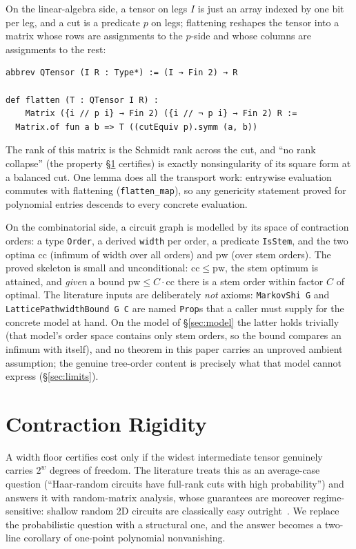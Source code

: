 \documentclass[sigplan,10pt,screen,review,anonymous]{acmart}
\newcommand{\cc}{\mathrm{cc}}
\newcommand{\pw}{\mathrm{pw}}
\begin{document}
On the linear-algebra side, a tensor on legs $I$ is just an array indexed by one bit per
leg, and a cut is a predicate $p$ on legs; flattening reshapes the tensor into a matrix
whose rows are assignments to the $p$-side and whose columns are assignments to the rest:

\begin{lstlisting}
abbrev QTensor (I R : Type*) := (I → Fin 2) → R

def flatten (T : QTensor I R) :
    Matrix ({i // p i} → Fin 2) ({i // ¬ p i} → Fin 2) R :=
  Matrix.of fun a b => T ((cutEquiv p).symm (a, b))
\end{lstlisting}

The rank of this matrix is the Schmidt rank across the cut, and ``no rank collapse''
(the property \S\ref{sec:rigidity} certifies) is exactly nonsingularity of its square
form at a balanced cut. One lemma does all the transport work: entrywise evaluation
commutes with flattening (\lstinline|flatten_map|), so any genericity statement proved for
polynomial entries descends to every concrete evaluation.

On the combinatorial side, a circuit graph is modelled by its space of contraction orders:
a type \lstinline|Order|, a derived \lstinline|width| per order, a predicate
\lstinline|IsStem|, and the two optima $\cc$ (infimum of width over all orders) and $\pw$
(over stem orders). The proved skeleton is small and unconditional: $\cc \le \pw$, the stem
optimum is attained, and \emph{given} a bound $\pw \le C\cdot\cc$ there is a stem order
within factor $C$ of optimal. The literature inputs are deliberately \emph{not} axioms:
\lstinline|MarkovShi G| and \lstinline|LatticePathwidthBound G C| are named
\lstinline|Prop|s that a caller must supply for the concrete model at hand. On the model of
\S\ref{sec:model} the latter holds trivially (that model's order space contains only stem
orders, so the bound compares an infimum with itself), and no theorem in this paper carries
an unproved ambient assumption; the genuine tree-order content is precisely what that model
cannot express (\S\ref{sec:limits}).

\section{Contraction Rigidity}\label{sec:rigidity}

A width floor certifies cost only if the widest intermediate tensor genuinely carries
$2^w$ degrees of freedom. The literature treats this as an average-case question
(``Haar-random circuits have full-rank cuts with high probability'') and answers it with
random-matrix analysis, whose guarantees are moreover regime-sensitive: shallow random 2D
circuits are classically easy outright~\cite{napp2022efficient}.
We replace the probabilistic question with a structural one, and the answer becomes a
two-line corollary of one-point polynomial nonvanishing.
\end{document}
